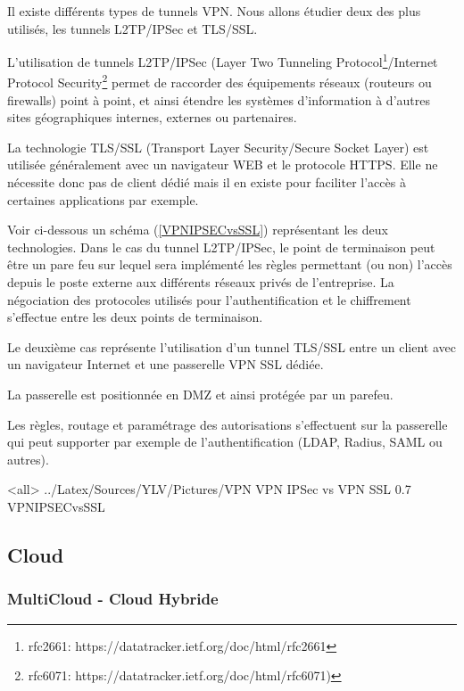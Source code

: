 Il existe différents types de tunnels VPN. Nous allons étudier deux des plus utilisés, les tunnels L2TP/IPSec et TLS/SSL.

L'utilisation de tunnels L2TP/IPSec (Layer Two Tunneling Protocol\footnote{rfc2661: https://datatracker.ietf.org/doc/html/rfc2661}/Internet Protocol Security\footnote{rfc6071: https://datatracker.ietf.org/doc/html/rfc6071)} permet de raccorder des équipements réseaux (routeurs ou firewalls) point à point, et ainsi étendre les systèmes d'information à d'autres sites géographiques internes, externes ou partenaires.

La technologie TLS/SSL (Transport Layer Security/Secure Socket Layer) est utilisée généralement avec un navigateur WEB et le protocole HTTPS. Elle ne nécessite donc pas de client dédié mais il en existe pour faciliter l'accès à certaines applications par exemple.

Voir ci-dessous un schéma (\ref{VPNIPSECvsSSL}) représentant les deux technologies.
Dans le cas du tunnel L2TP/IPSec, le point de terminaison peut être un pare feu sur lequel sera implémenté les règles permettant (ou non) l'accès depuis le poste externe aux différents réseaux privés de l'entreprise. La négociation des protocoles utilisés pour l'authentification et le chiffrement s'effectue entre les deux points de terminaison.

Le deuxième cas représente l'utilisation d'un tunnel TLS/SSL entre un client avec un navigateur Internet et une passerelle VPN SSL dédiée. 

La passerelle est positionnée en DMZ et ainsi protégée par un parefeu.

Les règles, routage et paramétrage des autorisations s'effectuent sur la passerelle qui peut supporter par exemple de l'authentification (LDAP, Radius, SAML ou autres).

\mode<all>{\picframe
{../Latex/Sources/YLV/Pictures/VPN}%
{VPN IPSec vs VPN SSL} %
{0.7} %
{VPNIPSECvsSSL} %
}


\subsection{Cloud}

\subsubsection{MultiCloud - Cloud Hybride}

